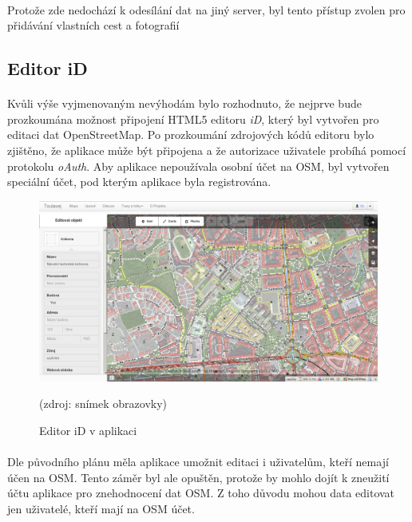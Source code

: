 \documentclass[11pt,a4paper,titlepage,oneside]{book}
\begin{document}
				\paragraph{} Protože zde nedochází k odesílání dat na jiný server, byl tento přístup zvolen pro přidávání vlastních cest a fotografií
			\subsection{Editor iD} 
				\paragraph{} Kvůli výše vyjmenovaným nevýhodám bylo rozhodnuto, že nejprve bude prozkoumána možnost připojení HTML5 editoru \textit{iD}, který byl vytvořen pro editaci dat OpenStreetMap. Po prozkoumání zdrojových kódů editoru bylo zjištěno, že aplikace může být připojena a že autorizace uživatele probíhá pomocí protokolu \textit{oAuth}. Aby aplikace nepoužívala osobní účet na \acl{OSM}, byl vytvořen speciální účet, pod kterým aplikace byla registrována. 

		\begin{figure}[!h]
			\begin{center}
				\includegraphics[width=12cm]{obrazky/toulavej/idToulavej.png}
				\caption{Editor iD v aplikaci }
				\label{fig:idToulavej}
				(zdroj: snímek obrazovky)
			\end{center}
		\end{figure}	

				\paragraph{} Dle původního plánu měla aplikace umožnit editaci i uživatelům, kteří nemají účen na \acl{OSM}. Tento záměr byl ale opuštěn, protože by mohlo dojít k zneužití účtu aplikace pro znehodnocení dat \acl{OSM}. Z toho důvodu mohou data editovat jen uživatelé, kteří mají na \ac{OSM} účet.
\end{document}
